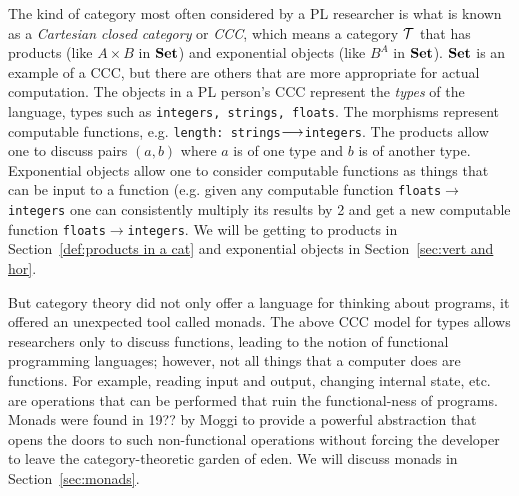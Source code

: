 \documentclass[../main/CT4S-EN-RU]{subfiles}
\begin{document}
\begin{blockRUS}
\end{blockRUS}

\begin{blockENG}
The kind of category most often considered by a PL researcher is what is known as a {\em Cartesian closed category} or {\em CCC}, which means a category $\mathcal{T}$ that has products (like $A\times B$ in ${\mathbf{Set}}$) and exponential objects (like $B^A$ in ${\mathbf{Set}}$). ${\mathbf{Set}}$ is an example of a CCC, but there are others that are more appropriate for actual computation. The objects in a PL person's CCC represent the {\em types} of the language, types such as {\tt integers, strings, floats}. The morphisms represent computable functions, e.g. {\tt length: strings}$\longrightarrow${\tt integers}. The products allow one to discuss pairs $(a,b)$ where $a$ is of one type and $b$ is of another type. Exponential objects allow one to consider computable functions as things that can be input to a function (e.g. given any computable function {\tt floats}$\to${\tt integers} one can consistently multiply its results by 2 and get a new computable function {\tt floats}$\to${\tt integers}. We will be getting to products in Section~\ref{def:products in a cat} and exponential objects in Section~\ref{sec:vert and hor}. 
\end{blockENG}

\begin{blockRUS}
\end{blockRUS}

\begin{blockENG}
But category theory did not only offer a language for thinking about programs, it offered an unexpected tool called monads. The above CCC model for types allows researchers only to discuss functions, leading to the notion of functional programming languages; however, not all things that a computer does are functions. For example, reading input and output, changing internal state, etc. are operations that can be performed that ruin the functional-ness of programs. Monads were found in 19?? by Moggi \cite{Mog} to provide a powerful abstraction that opens the doors to such non-functional operations without forcing the developer to leave the category-theoretic garden of eden. We will discuss monads in Section~\ref{sec:monads}.
\end{blockENG}

\begin{blockRUS}
\end{blockRUS}
\end{document}
